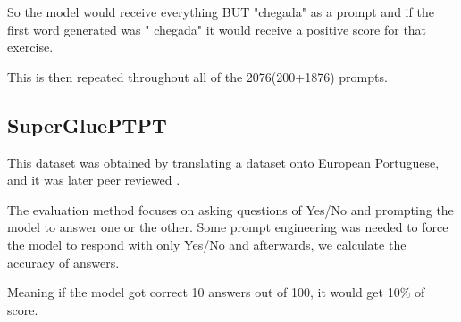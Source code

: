 So the model would receive everything BUT "chegada" as a prompt and if the first word generated was " chegada" it would receive a positive
score for that exercise.

This is then repeated throughout all of the 2076(200+1876) prompts.

\subsection{SuperGluePTPT}
This dataset was obtained by translating a dataset  onto European Portuguese,
and it was later peer reviewed .

The evaluation method focuses on asking questions of Yes/No and prompting the model to answer one or the other.
Some prompt engineering was needed to force the model to respond with only Yes/No and afterwards, we calculate the accuracy of answers.

Meaning if the model got correct 10 answers out of 100, it would get 10\% of score.


\section{}